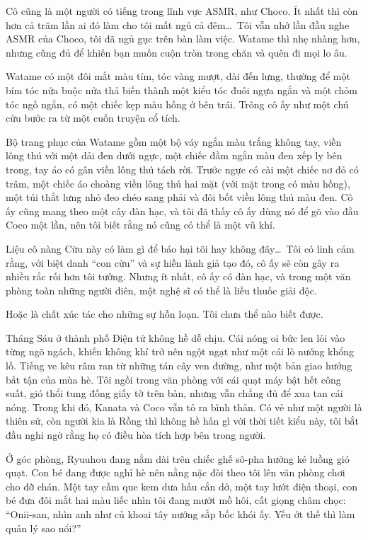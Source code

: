 \documentclass[../main.tex]{subfiles}
\begin{document}
Cô cũng là một người có tiếng trong lĩnh vực ASMR, như Choco. Ít nhất thì còn hơn cả trăm lần ai đó làm cho tôi mất ngủ cả đêm\dots\ Tôi vẫn nhớ lần đầu nghe ASMR của Choco, tôi đã ngủ gục trên bàn làm việc. Watame thì nhẹ nhàng hơn, nhưng cũng đủ để khiến bạn muốn cuộn tròn trong chăn và quên đi mọi lo âu.

Watame có một đôi mắt màu tím, tóc vàng mượt, dài đến lưng, thường để một bím tóc nửa buộc nửa thả biến thành một kiểu tóc đuôi ngựa ngắn và một chỏm tóc ngố ngắn, có một chiếc kẹp màu hồng ở bên trái. Trông cô ấy như một chú cừu bước ra từ một cuốn truyện cổ tích.

Bộ trang phục của Watame gồm một bộ váy ngắn màu trắng không tay, viền lông thú với một dải đen dưới ngực, một chiếc đầm ngắn màu đen xếp ly bên trong, tay áo có gân viền lông thú tách rời. Trước ngực có cài một chiếc nơ đỏ có trâm, một chiếc áo choàng viền lông thú hai mặt (với mặt trong có màu hồng), một túi thắt lưng nhỏ đeo chéo sang phải và đôi bốt viền lông thú màu đen. Cô ấy cũng mang theo một cây đàn hạc, và tôi đã thấy cô ấy dùng nó để gõ vào đầu Coco một lần, nên tôi biết rằng nó cũng có thể là một vũ khí.

\chrint

Liệu cô nàng Cừu này có làm gì để báo hại tôi hay không đây\dots\ Tôi có linh cảm rằng, với biệt danh ``con cừu'' và sự hiền lành giả tạo đó, cô ấy sẽ còn gây ra nhiều rắc rối hơn tôi tưởng. Nhưng ít nhất, cô ấy có đàn hạc, và trong một văn phòng toàn những người điên, một nghệ sĩ có thể là liều thuốc giải độc.

Hoặc là chất xúc tác cho những sự hỗn loạn. Tôi chưa thể nào biết được.

\il

Tháng Sáu ở thành phố Điện tử không hề dễ chịu. Cái nóng oi bức len lỏi vào từng ngõ ngách, khiến không khí trở nên ngột ngạt như một cái lò nướng khổng lồ. Tiếng ve kêu râm ran từ những tán cây ven đường, như một bản giao hưởng bất tận của mùa hè. Tôi ngồi trong văn phòng với cái quạt máy bật hết công suất, gió thổi tung đống giấy tờ trên bàn, nhưng vẫn chẳng đủ để xua tan cái nóng. Trong khi đó, Kanata và Coco vẫn tỏ ra bình thản. Có vẻ như một người là thiên sứ, còn người kia là Rồng thì không hề hấn gì với thời tiết kiểu này, tôi bắt đầu nghi ngờ rằng họ có điều hòa tích hợp bên trong người.

Ở góc phòng, Ryuuhou đang nằm dài trên chiếc ghế sô-pha hưởng ké luồng gió quạt. Con bé đang được nghỉ hè nên nằng nặc đòi theo tôi lên văn phòng chơi cho đỡ chán. Một tay cầm que kem dưa hấu cắn dở, một tay lướt điện thoại, con bé đưa đôi mắt hai màu liếc nhìn tôi đang mướt mồ hôi, cất giọng châm chọc: ``Onii-san, nhìn anh như củ khoai tây nướng sắp bốc khói ấy. Yếu ớt thế thì làm quản lý sao nổi?''
\end{document}

